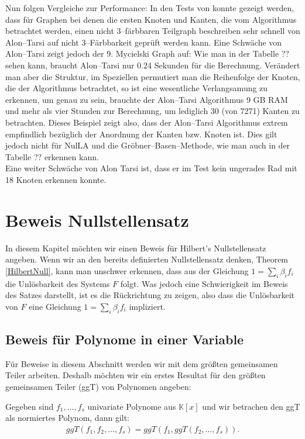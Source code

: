\noindent Nun folgen Vergleiche zur Performance: In den Tests von \cite{Loera2011} konnte gezeigt werden, dass für Graphen bei denen die ersten Knoten und Kanten, die vom Algorithmus betrachtet werden, einen nicht 3--färbbaren Teilgraph beschreiben sehr schnell von Alon--Tarsi auf nicht 3--Färbbarkeit geprüft werden kann. Eine Schwäche von Alon--Tarsi zeigt jedoch der 9. Mycielski Graph auf: Wie man in der Tabelle ?? sehen kann, braucht Alon--Tarsi nur 0.24 Sekunden für die Berechnung. Verändert man aber die Struktur, im Speziellen permutiert man die Reihenfolge der Knoten, die der Algorithmus betrachtet, so ist eine wesentliche Verlangsamung zu erkennen, um genau zu sein, brauchte der Alon--Tarsi Algorithmus 9 GB RAM und mehr als vier Stunden zur Berechnung, um lediglich 30 (von 7271) Kanten zu betrachten. Dieses Beispiel zeigt also, dass der Alon--Tarsi Algorithmus extrem empfindlich bezüglich der Anordnung der Kanten bzw. Knoten ist. Dies gilt jedoch nicht für NulLA und die Gröbner--Basen--Methode, wie man auch in der Tabelle ?? erkennen kann.\\
Eine weiter Schwäche von Alon Tarsi ist, dass er im Test kein ungerades Rad mit 18 Knoten erkennen konnte. \cite{Loera2011}

\section{Beweis Nullstellensatz} \label{beweis}

In diesem Kapitel möchten wir einen Beweis für Hilbert's Nullstellensatz angeben.
Wenn wir an den bereits definierten Nullstellensatz denken, Theorem \ref{HilbertNull}, kann man unschwer erkennen, dass aus der Gleichung $1 = \sum_i \beta_if_i$ die Unlösbarkeit des Systems $F$ folgt. Was jedoch eine Schwierigkeit im Beweis des Satzes darstellt, ist es die Rückrichtung zu zeigen, also dass die Unlösbarkeit von $F$ eine Gleichung $1 = \sum_i \beta_if_i$ impliziert. \cite{Ausgangsartikel}

\subsection{Beweis für Polynome in einer Variable}

Für Beweise in diesem Abschnitt werden wir mit dem größten gemeinsamen Teiler arbeiten. Deshalb möchten wir ein erstes Resultat für den größten gemeinsamen Teiler (ggT) von Polynomen angeben:
\begin{lemma} \label{gcd1}
Gegeben sind $f_1,\ldots ,f_s$ univariate Polynome aus $\mathbb{K}[x]$ und wir betrachen den ggT als normiertes Polynom, dann gilt:
\begin{align*}
ggT (f_1,f_2,\ldots,f_s) = ggT(f_1,ggT(f_2,\ldots,f_s)).
\end{align*}
\end{lemma}

